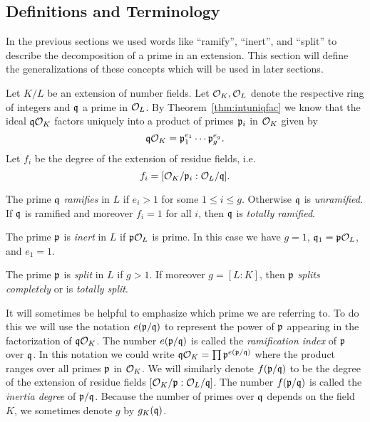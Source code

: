 \subsection{Definitions and Terminology}

In the previous sections we used words like ``ramify'',
``inert'', and ``split'' to describe the decomposition
of a prime in an extension. This section will define
the generalizations of these concepts which will be used
in later sections.

Let $K/L$ be an extension of number fields. Let
$\mathcal{O}_K,\mathcal{O}_L$ denote the respective ring of integers
and $\mathfrak{q}$ a prime in $\mathcal{O}_L$. By Theorem~\ref{thm:intuniqfac} we
know that the ideal $\mathfrak{q}\mathcal{O}_K$ factors uniquely into a product
of primes $\mathfrak{p}_i$ in $\mathcal{O}_K$ given by
$$
\mathfrak{q}\mathcal{O}_K = \mathfrak{p}_1^{e_1}\cdots\mathfrak{p}_g^{e_g}.
$$
Let $f_i$ be the degree of the extension of
residue fields, i.e.
$$
f_i = [\mathcal{O}_K/\mathfrak{p}_i : \mathcal{O}_L/\mathfrak{q}].
$$

\begin{definition}\label{def:ramify}
	The prime $\mathfrak{q}$ \emph{ramifies} in $L$
	if $e_i>1$ for some $1\leq i\leq g$.
	Otherwise $\mathfrak{q}$ is \emph{unramified}.
	If $\mathfrak{q}$ is ramified and moreover $f_i=1$
	for all $i$, then $\mathfrak{q}$ is \emph{totally ramified}.
\end{definition}

\begin{definition}\label{def:inert}
	The prime $\mathfrak{p}$ is \emph{inert} in $L$
	if $\mathfrak{p}\mathcal{O}_L$ is prime. In this case we have $g=1$,
	$\mathfrak{q}_1=\mathfrak{p}\mathcal{O}_L$, and $e_1=1$.
\end{definition}

\begin{definition}\label{def:split}
	The prime $\mathfrak{p}$ is \emph{split} in $L$
	if $g>1$. If moreover $g = [L : K]$, then
	$\mathfrak{p}$ \emph{splits completely} or is
	\emph{totally split}.
\end{definition}

It will sometimes be helpful to emphasize which prime we are
referring to. To do this we will use the notation $e(\mathfrak{p}/\mathfrak{q})$
to represent the power of $\mathfrak{p}$ appearing in the
factorization of $\mathfrak{q}\mathcal{O}_K$. The number $e(\mathfrak{p}/\mathfrak{q})$ is called the
\emph{ramification index} of $\mathfrak{p}$ over $\mathfrak{q}$.
In this notation we could write $\mathfrak{q}\mathcal{O}_K = \prod \mathfrak{p}^{e(\mathfrak{p}/\mathfrak{q})}$
where the product ranges over all primes $\mathfrak{p}$ in $\mathcal{O}_K$.
We will similarly denote $f(\mathfrak{p}/\mathfrak{q})$ to be the degree of the extension
of residue fields $[\mathcal{O}_K/\mathfrak{p}:\mathcal{O}_L/\mathfrak{q}]$. The number $f(\mathfrak{p}/\mathfrak{q})$ is called
the \emph{inertia degree} of $\mathfrak{p}/\mathfrak{q}$. Because the number of primes
over $\mathfrak{q}$ depends on the field $K$, we sometimes denote $g$ by $g_K(\mathfrak{q})$.

